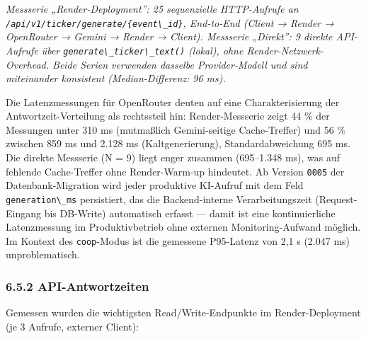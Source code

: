 \emph{Messserie „Render-Deployment'': 25 sequenzielle HTTP-Aufrufe an
\passthrough{\lstinline!/api/v1/ticker/generate/\{event\_id\}!},
End-to-End (Client → Render → OpenRouter → Gemini → Render → Client).
Messserie „Direkt'': 9 direkte API-Aufrufe über
\passthrough{\lstinline!generate\_ticker\_text()!} (lokal), ohne
Render-Netzwerk-Overhead. Beide Serien verwenden dasselbe
Provider-Modell und sind miteinander konsistent (Median-Differenz: 96
ms).}

Die Latenzmessungen für OpenRouter deuten auf eine Charakterisierung der
Antwortzeit-Verteilung als rechtssteil hin: Render-Messserie zeigt 44 \%
der Messungen unter 310 ms (mutmaßlich Gemini-seitige Cache-Treffer) und
56 \% zwischen 859 ms und 2.128 ms (Kaltgenerierung), Standardabweichung
695 ms. Die direkte Messserie (N = 9) liegt enger zusammen (695--1.348
ms), was auf fehlende Cache-Treffer ohne Render-Warm-up hindeutet. Ab
Version \passthrough{\lstinline!0005!} der Datenbank-Migration wird
jeder produktive KI-Aufruf mit dem Feld
\passthrough{\lstinline!generation\_ms!} persistiert, das die
Backend-interne Verarbeitungszeit (Request-Eingang bis DB-Write)
automatisch erfasst --- damit ist eine kontinuierliche Latenzmessung im
Produktivbetrieb ohne externen Monitoring-Aufwand möglich. Im Kontext
des \passthrough{\lstinline!coop!}-Modus ist die gemessene P95-Latenz
von 2,1 s (2.047 ms) unproblematisch.

\subsubsection{6.5.2 API-Antwortzeiten}\label{api-antwortzeiten}

Gemessen wurden die wichtigsten Read/Write-Endpunkte im
Render-Deployment (je 3 Aufrufe, externer Client):

